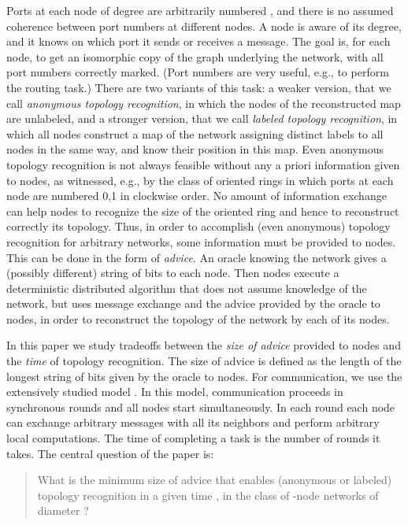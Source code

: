 \documentclass{article}
\begin{document}
 Ports at each node of degree  are 
arbitrarily numbered , and there is no assumed coherence between port numbers at different nodes. A node is aware of its degree, and it knows on which port it sends or receives a message. 
The goal is, for each node, to get an isomorphic copy of the graph underlying the
network, with all port numbers correctly  marked. (Port numbers are very useful, e.g., to perform the routing task.)
There are two variants of this task:
a weaker version, that we call
{\em anonymous topology recognition}, in which the nodes of the reconstructed map are unlabeled,
and a stronger version, that we call {\em labeled topology recognition}, in which all nodes construct 
a map of the network assigning distinct labels to all nodes in the same way, and know their position in this map.
Even anonymous topology recognition is not always feasible without any a priori information given to nodes, as witnessed, e.g.,  by the class
of oriented rings in which ports at each node are numbered 0,1 in clockwise order. No amount of information exchange can help nodes to recognize the size of the oriented ring and hence to reconstruct
correctly its topology. Thus, in order to accomplish (even anonymous) topology recognition for arbitrary networks, some information must be provided to nodes. This can be done in the form of {\em advice}. An oracle knowing the network gives a (possibly different) string of bits to each node. Then nodes execute
a deterministic distributed algorithm that does not assume knowledge of the network, but uses message exchange and the advice provided
by the oracle to nodes, in order to reconstruct the topology of the network by each of its nodes. 

In this paper we study tradeoffs between the {\em size of advice} provided to nodes and the {\em time} of topology recognition. The size of advice is defined as the length of the longest string of bits
given by the oracle to nodes. For communication,
we use the extensively studied  model  \cite{Pe}. 
In this model, communication proceeds in synchronous rounds
and all nodes start simultaneously. In each round each node
can exchange arbitrary messages with all its neighbors and perform arbitrary local computations. 
The time of completing a task is the number of rounds it takes. 
The central question of the paper is:

\begin{quotation}
What is the minimum size of advice that enables (anonymous or labeled) topology recognition in a given time ,
in the class of -node networks of diameter ?
\end{quotation}
\end{document}
